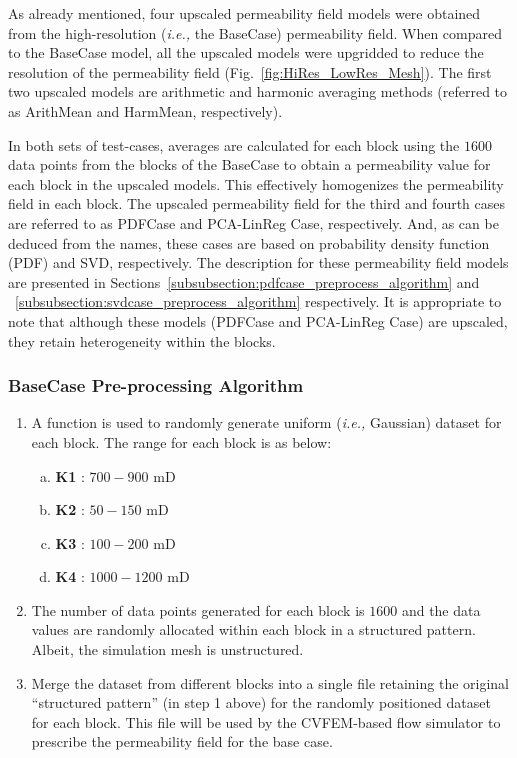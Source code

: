 \documentclass[preprint,12pt]{elsarticle}
\newcommand{\ie}{{\it i.e., }}
\begin{document}
As already mentioned, four upscaled permeability field models were obtained from the high-resolution (\ie the BaseCase) permeability field. When compared to the BaseCase model, all the upscaled models were upgridded to reduce the resolution of the permeability field (Fig.~\ref{fig:HiRes_LowRes_Mesh}). The first two upscaled models are arithmetic and harmonic averaging methods  (referred to as ArithMean and HarmMean, respectively).

In both sets of test-cases, averages are calculated for each block using the $1600$ data points from the blocks of the BaseCase to obtain a permeability value for each block in the upscaled models. This effectively homogenizes the permeability field in each block. The upscaled permeability field for the third and fourth cases are referred to as PDFCase and PCA-LinReg Case, respectively. And, as can be deduced from the names, these cases are based on probability density function (PDF) and SVD, respectively. The description for these permeability field models are presented in Sections~\ref{subsubsection:pdfcase_preprocess_algorithm} and ~\ref{subsubsection:svdcase_preprocess_algorithm} respectively. It is appropriate to note that although these models (PDFCase and PCA-LinReg Case) are upscaled, they retain heterogeneity within the blocks.

\subsubsection{BaseCase Pre-processing Algorithm}\label{subsubsection:basecase_preprocess_algorithm}
\begin{enumerate}[1.]
  \item A function is used to randomly generate uniform (\ie Gaussian) dataset for each block. The range for each block is as below:
  \begin{enumerate}[a)]
    \item \textbf{K1} : $700 - 900$ mD
    \item \textbf{K2} : $50 - 150$ mD
    \item \textbf{K3} : $100 - 200$ mD
    \item \textbf{K4} : $1000 - 1200$ mD
  \end{enumerate}                                                    
  \item The number of data points generated for each block is $1600$ and the data values are randomly allocated within each block in a structured pattern. Albeit, the simulation mesh is unstructured.
  \item Merge the dataset from different blocks into a single file retaining the original ``structured pattern'' (in step 1 above) for the randomly positioned dataset for each block. This file will be used by the CVFEM-based flow simulator to prescribe the permeability field for the base case.
\end{enumerate}
\end{document}
